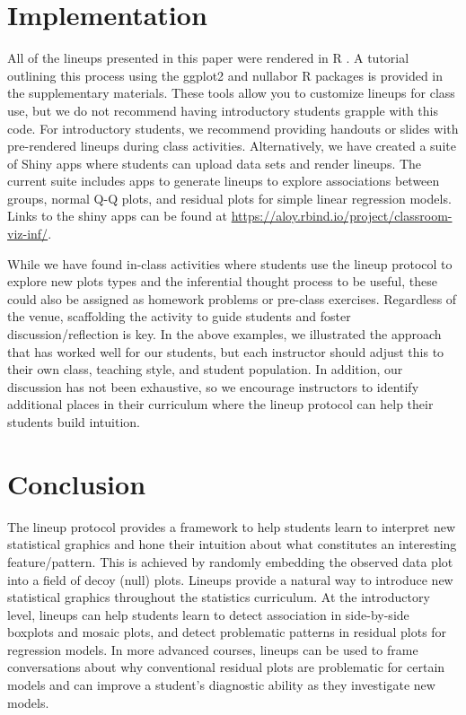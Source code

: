\documentclass[12pt]{article}
\begin{document}
\hypertarget{implementation}{%
\section{Implementation}\label{implementation}}

\label{sec:implement}

All of the lineups presented in this paper were rendered in R \citep{r}.
A tutorial outlining this process using the ggplot2 \citep{ggplot2} and
nullabor \citep{nullabor} R packages is provided in the supplementary
materials. These tools allow you to customize lineups for class use, but
we do not recommend having introductory students grapple with this code.
For introductory students, we recommend providing handouts or slides
with pre-rendered lineups during class activities. Alternatively, we
have created a suite of Shiny apps \citep{shiny} where students can
upload data sets and render lineups. The current suite includes apps to
generate lineups to explore associations between groups, normal Q-Q
plots, and residual plots for simple linear regression models. Links to
the shiny apps can be found at
\url{https://aloy.rbind.io/project/classroom-viz-inf/}.

While we have found in-class activities where students use the lineup
protocol to explore new plots types and the inferential thought process
to be useful, these could also be assigned as homework problems or
pre-class exercises. Regardless of the venue, scaffolding the activity
to guide students and foster discussion/reflection is key. In the above
examples, we illustrated the approach that has worked well for our
students, but each instructor should adjust this to their own class,
teaching style, and student population. In addition, our discussion has
not been exhaustive, so we encourage instructors to identify additional
places in their curriculum where the lineup protocol can help their
students build intuition.

\hypertarget{conclusion}{%
\section{Conclusion}\label{conclusion}}

\label{sec:conclusion}

The lineup protocol provides a framework to help students learn to
interpret new statistical graphics and hone their intuition about what
constitutes an interesting feature/pattern. This is achieved by randomly
embedding the observed data plot into a field of decoy (null) plots.
Lineups provide a natural way to introduce new statistical graphics
throughout the statistics curriculum. At the introductory level, lineups
can help students learn to detect association in side-by-side boxplots
and mosaic plots, and detect problematic patterns in residual plots for
regression models. In more advanced courses, lineups can be used to
frame conversations about why conventional residual plots are
problematic for certain models and can improve a student's diagnostic
ability as they investigate new models.
\end{document}
